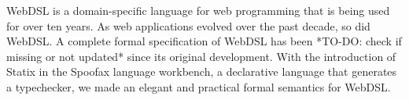 
WebDSL is a domain-specific language for web programming that is being used for over ten years. As web applications evolved over the past decade, so did WebDSL. A complete formal specification of WebDSL has been *TO-DO: check if missing or not updated* since its original development. With the introduction of Statix in the Spoofax language workbench, a declarative language that generates a typechecker, we made an elegant and practical formal semantics for WebDSL.
